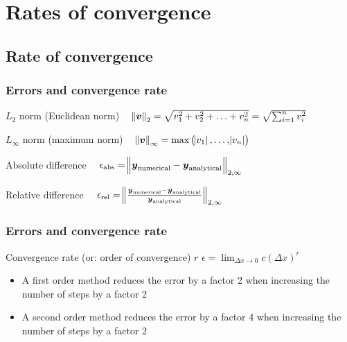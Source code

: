 \documentclass[11pt,table,final,fleqn,xcolor={usenames,dvipsnames,table}]{beamer}
\begin{document}
\section{Rates of convergence}
\subsection*{Rate of convergence}
\begin{frame}
  \frametitle{Errors and convergence rate}
  \begin{block}{$L_2$ norm (Euclidean norm)}
    $ \quad \norm{\boldsymbol{v}}_2 = \sqrt{v_1^2+v_2^2+\ldots+v_n^2} = \sqrt{\sum_{i=1}^n v_i^2} $
  \end{block}
  \begin{block}{$L_\infty$ norm (maximum norm)}
    $ \quad \norm{\boldsymbol{v}}_\infty = \text{max}\left( \abs{v_1},\ldots,\abs{v_n}\right) $
  \end{block}
  \begin{block}{Absolute difference}
    $ \quad \epsilon_\text{abs} = \norm{\boldsymbol{y}_\text{numerical} - \boldsymbol{y}_\text{analytical}}_{2,\infty} $
  \end{block}
  \begin{block}{Relative difference}
    $ \quad \epsilon_\text{rel} = \norm{\frac{\boldsymbol{y}_\text{numerical} - \boldsymbol{y}_\text{analytical}}{\boldsymbol{y}_\text{analytical}}}_{2,\infty} $
  \end{block}
\end{frame}

\begin{frame}
  \frametitle{Errors and convergence rate}
  \footnotesize\selectfont
   \begin{block}{Convergence rate (or: order of convergence) $r$}
  $\displaystyle \epsilon = \lim_{\Delta x \rightarrow 0} c(\Delta x)^r $
  \end{block}
  \begin{itemize}
    \item A first order method reduces the error by a factor 2 when increasing the number of steps by a factor 2
    \item A second order method reduces the error by a factor 4 when increasing the number of steps by a factor 2
  \end{itemize}
\end{frame}
\end{document}
